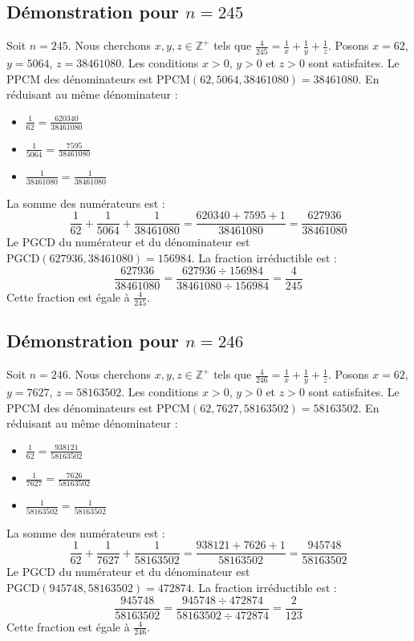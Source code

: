 \documentclass[11pt,a4paper]{article}
\begin{document}
\subsection{Démonstration pour $n = 245$}
Soit $n = 245$. Nous cherchons $x, y, z \in \mathbb{Z}^{+}$ tels que $\frac{4}{245} = \frac{1}{x} + \frac{1}{y} + \frac{1}{z}$.
Posons $x = 62$, $y = 5064$, $z = 38461080$.
Les conditions $x > 0$, $y > 0$ et $z > 0$ sont satisfaites.
Le PPCM des dénominateurs est $\text{PPCM}(62, 5064, 38461080) = 38461080$.
En réduisant au même dénominateur :
\begin{itemize}
    \item $\frac{1}{62} = \frac{620340}{38461080}$
    \item $\frac{1}{5064} = \frac{7595}{38461080}$
    \item $\frac{1}{38461080} = \frac{1}{38461080}$
\end{itemize}
La somme des numérateurs est :
$$ \frac{1}{62} + \frac{1}{5064} + \frac{1}{38461080} = \frac{620340 + 7595 + 1}{38461080} = \frac{627936}{38461080} $$
Le PGCD du numérateur et du dénominateur est $\text{PGCD}(627936, 38461080) = 156984$.
La fraction irréductible est :
$$ \frac{627936}{38461080} = \frac{627936 \div 156984}{38461080 \div 156984} = \frac{4}{245} $$
Cette fraction est égale à $\frac{4}{245}$.

\subsection{Démonstration pour $n = 246$}
Soit $n = 246$. Nous cherchons $x, y, z \in \mathbb{Z}^{+}$ tels que $\frac{4}{246} = \frac{1}{x} + \frac{1}{y} + \frac{1}{z}$.
Posons $x = 62$, $y = 7627$, $z = 58163502$.
Les conditions $x > 0$, $y > 0$ et $z > 0$ sont satisfaites.
Le PPCM des dénominateurs est $\text{PPCM}(62, 7627, 58163502) = 58163502$.
En réduisant au même dénominateur :
\begin{itemize}
    \item $\frac{1}{62} = \frac{938121}{58163502}$
    \item $\frac{1}{7627} = \frac{7626}{58163502}$
    \item $\frac{1}{58163502} = \frac{1}{58163502}$
\end{itemize}
La somme des numérateurs est :
$$ \frac{1}{62} + \frac{1}{7627} + \frac{1}{58163502} = \frac{938121 + 7626 + 1}{58163502} = \frac{945748}{58163502} $$
Le PGCD du numérateur et du dénominateur est $\text{PGCD}(945748, 58163502) = 472874$.
La fraction irréductible est :
$$ \frac{945748}{58163502} = \frac{945748 \div 472874}{58163502 \div 472874} = \frac{2}{123} $$
Cette fraction est égale à $\frac{4}{246}$.
\end{document}
